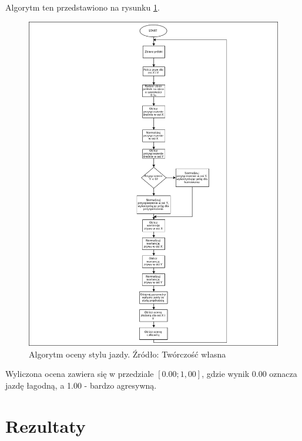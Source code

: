 Algorytm ten przedstawiono na rysunku \ref{fig:image_driving_analysis_alghoritm}.

\begin{figure}[H]
	\centering
	\includegraphics[width=15cm]{img/driving_analysis/driving_analysis.png}
	\caption{Algorytm oceny stylu jazdy. Źródło: Twórczość własna}
	\label{fig:image_driving_analysis_alghoritm}
\end{figure}

Wyliczona ocena zawiera się w przedziale $[0.00; 1,00]$, gdzie wynik 0.00 oznacza jazdę łagodną, a 1.00 - bardzo agresywną. 


\section{Rezultaty}
